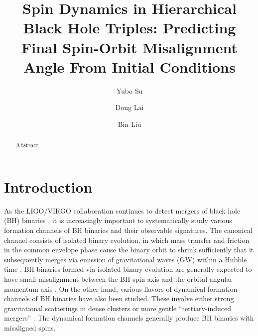 \documentclass[
        twocolumn,
        twocolappendix
    ]{aastex63}
\begin{document}
\title{Spin Dynamics in Hierarchical Black Hole Triples: Predicting Final
Spin-Orbit Misalignment Angle From Initial Conditions}


\author[0000-0001-8283-3425]{Yubo Su}%

\author[0000-0002-1934-6250]{Dong Lai}%

\author[0000-0002-0643-8295]{Bin Liu}%

\begin{abstract}
    Abstract
\end{abstract}


\section{Introduction}\label{s:intro}

As the LIGO/VIRGO collaboration continues to detect mergers of black hole (BH)
binaries \citep[e.g.][]{Abbott:2016blz, abbott2019binary}, it is increasingly
important to systematically study various formation channels of BH binaries and
their observable signatures. The canonical channel consists of isolated binary
evolution, in which mass transfer and friction in the common envelope phase
cause the binary orbit to shrink sufficiently that it subsequently merges via
emission of gravitational waves (GW) within a Hubble time
\citep[e.g.][]{lipunov1997black, lipunov2017first, podsiadlowski2003formation,
belczynski2010effect, belczynski2016first, dominik2012double, dominik2013double,
dominik2015double}. BH binaries formed via isolated binary evolution are
generally expected to have small misalignment between the BH spin axis and the
orbital angular momentum axis \citep{postnov2019black,
belczynski2020evolutionary}. On the other hand, various flavors of dynamical
formation channels of BH binaries have also been studied. These involve either
strong gravitational scatterings in dense clusters
\citep[e.g.][]{zwart1999black, o2006binary, miller2009mergers,
banerjee2010stellar, downing2010compact, ziosi2014dynamics, rodriguez2015binary,
samsing2017assembly, samsing2018black, rodriguez2018post, gondan2018eccentric}
or more gentle ``tertiary-induced mergers'' \citep[e.g.][]{blaes2002kozai,
miller2002four, wen2003eccentricity, antonini2012secular, antonini2017binary,
silsbee2016lidov, bin1, bin2, randall2018induced, hoang2018black}. The dynamical
formation channels generally produce BH binaries with misaligned spins.
\end{document}
